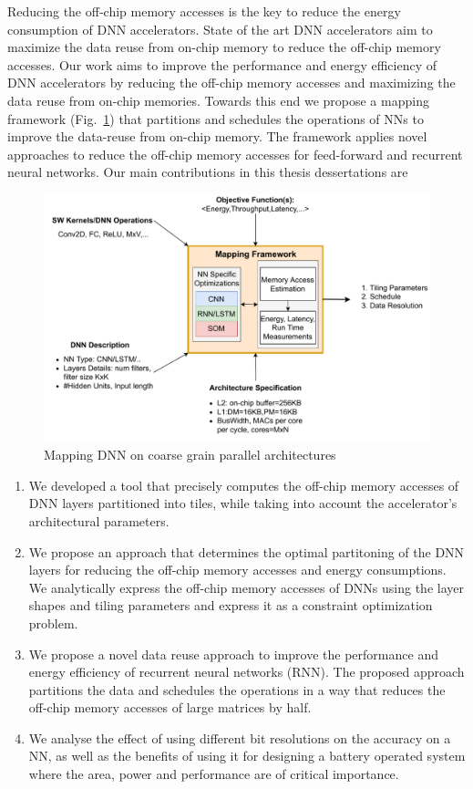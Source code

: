 \documentclass[a4paper,10pt]{article}
\begin{document}
Reducing the off-chip memory accesses is the key to reduce the energy consumption of DNN accelerators. State of the art DNN accelerators aim to maximize the data reuse from on-chip memory to reduce the off-chip memory accesses. Our work aims to improve the performance and energy efficiency of DNN accelerators by reducing the off-chip memory accesses and maximizing the data reuse from on-chip memories. Towards this end we propose a mapping framework (Fig.~\ref{fig:introduction}) that partitions and schedules the operations of NNs to improve the data-reuse from on-chip memory. The framework applies novel approaches to reduce the off-chip memory accesses for feed-forward and recurrent neural networks. Our main contributions in this thesis dessertations are
\begin{figure}[ht]
	\centering
	\includegraphics[width=0.7\linewidth]{./images/blockDiagram}
	\caption{Mapping DNN on coarse grain parallel architectures}
	\label{fig:introduction}
\end{figure}
\begin{enumerate}
	\item We developed a tool that precisely computes the off-chip memory accesses of DNN layers partitioned into tiles, while taking into account the accelerator's architectural parameters.
	\item We propose an approach that determines the optimal partitoning of the DNN layers for reducing the off-chip memory accesses and energy consumptions. We analytically express the off-chip memory accesses of DNNs  using the layer shapes and tiling parameters and express it as a constraint optimization problem.
	\item We propose a novel data reuse approach to improve the performance and energy efficiency of recurrent neural networks (RNN). The proposed approach partitions the data and schedules the operations in a way that reduces the off-chip memory accesses of large matrices by half.
	\item We analyse the effect of using different bit resolutions on the accuracy on a NN, as well as the benefits of using it for designing a battery operated system where the area, power and performance are of critical importance.
\end{enumerate}
\end{document}
